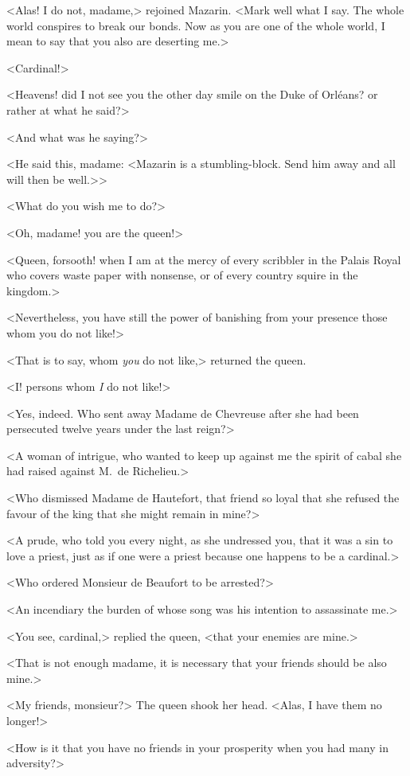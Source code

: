 <Alas! I do not, madame,> rejoined Mazarin. <Mark well what I say. The whole world conspires to break our bonds. Now as you are one of the whole world, I mean to say that you also are deserting me.>

<Cardinal!>

<Heavens! did I not see you the other day smile on the Duke of Orléans? or rather at what he said?>

<And what was he saying?>

<He said this, madame: <Mazarin is a stumbling-block. Send him away and all will then be well.>>

<What do you wish me to do?>

<Oh, madame! you are the queen!>

<Queen, forsooth! when I am at the mercy of every scribbler in the Palais Royal who covers waste paper with nonsense, or of every country squire in the kingdom.>

<Nevertheless, you have still the power of banishing from your presence those whom you do not like!>

<That is to say, whom \emph{you} do not like,> returned the queen.

<I\@! persons whom \emph{I} do not like!>

<Yes, indeed. Who sent away Madame de Chevreuse after she had been persecuted twelve years under the last reign?>

<A woman of intrigue, who wanted to keep up against me the spirit of cabal she had raised against M.~de Richelieu.>

<Who dismissed Madame de Hautefort, that friend so loyal that she refused the favour of the king that she might remain in mine?>

<A prude, who told you every night, as she undressed you, that it was a sin to love a priest, just as if one were a priest because one happens to be a cardinal.>

<Who ordered Monsieur de Beaufort to be arrested?>

<An incendiary the burden of whose song was his intention to assassinate me.>

<You see, cardinal,> replied the queen, <that your enemies are mine.>

<That is not enough madame, it is necessary that your friends should be also mine.>

<My friends, monsieur?> The queen shook her head. <Alas, I have them no longer!>

<How is it that you have no friends in your prosperity when you had many in adversity?>

